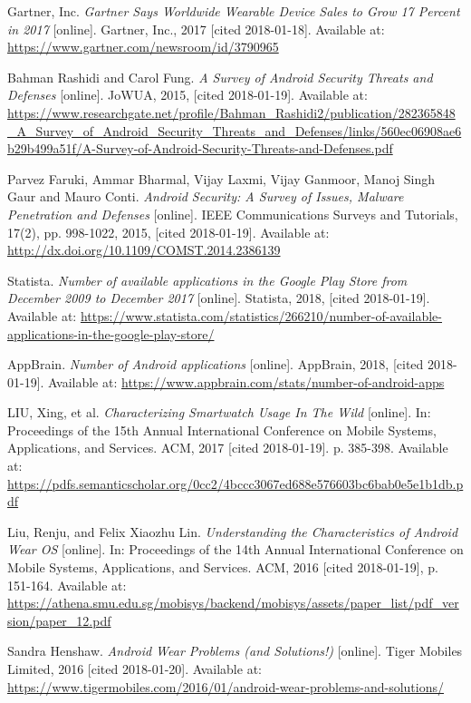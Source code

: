 \begin{thebibliography}{10}
Gartner, Inc. \textit{Gartner Says Worldwide Wearable Device Sales to Grow 17 Percent in 2017} [online]. Gartner, Inc., 2017 [cited 2018-01-18]. Available at: \url{https://www.gartner.com/newsroom/id/3790965}

Bahman Rashidi and Carol Fung. \textit{A Survey of Android Security Threats and Defenses} [online]. JoWUA, 2015, [cited 2018-01-19]. Available at: \url{https://www.researchgate.net/profile/Bahman_Rashidi2/publication/282365848_A_Survey_of_Android_Security_Threats_and_Defenses/links/560ec06908ae6b29b499a51f/A-Survey-of-Android-Security-Threats-and-Defenses.pdf}

Parvez Faruki, Ammar Bharmal, Vijay Laxmi, Vijay Ganmoor, Manoj Singh Gaur and Mauro Conti. \textit{Android Security: A Survey of Issues, Malware Penetration and Defenses} [online]. IEEE Communications Surveys and Tutorials, 17(2), pp. 998-1022, 2015, [cited 2018-01-19]. Available at: \url{http://dx.doi.org/10.1109/COMST.2014.2386139}

Statista. \textit{Number of available applications in the Google Play Store from December 2009 to December 2017} [online]. Statista, 2018, [cited 2018-01-19]. Available at: \url{https://www.statista.com/statistics/266210/number-of-available-applications-in-the-google-play-store/}

AppBrain. \textit{Number of Android applications} [online]. AppBrain, 2018, [cited 2018-01-19]. Available at: \url{https://www.appbrain.com/stats/number-of-android-apps}

LIU, Xing, et al. \textit{Characterizing Smartwatch Usage In The Wild} [online]. In: Proceedings of the 15th Annual International Conference on Mobile Systems, Applications, and Services. ACM, 2017 [cited 2018-01-19]. p. 385-398. Available at: \url{https://pdfs.semanticscholar.org/0cc2/4bccc3067ed688e576603bc6bab0e5e1b1db.pdf}

Liu, Renju, and Felix Xiaozhu Lin. \textit{Understanding the Characteristics of Android Wear OS} [online]. In: Proceedings of the 14th Annual International Conference on Mobile Systems, Applications, and Services. ACM, 2016 [cited 2018-01-19], p. 151-164. Available at: \url{https://athena.smu.edu.sg/mobisys/backend/mobisys/assets/paper_list/pdf_version/paper_12.pdf}

Sandra Henshaw. \textit{Android Wear Problems (and Solutions!)} [online]. Tiger Mobiles Limited, 2016 [cited 2018-01-20]. Available at: \url{https://www.tigermobiles.com/2016/01/android-wear-problems-and-solutions/}


\end{thebibliography}
